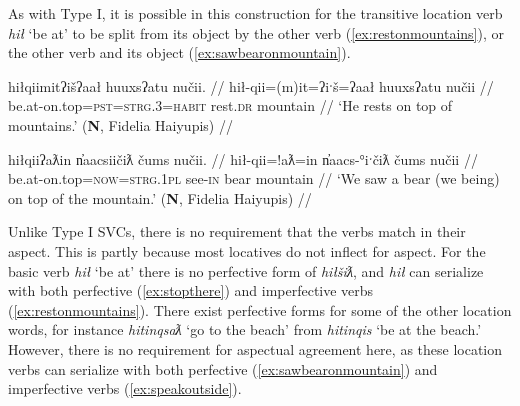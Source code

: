 As with Type I, it is possible in this construction for the transitive location verb \textit{hił} `be at' to be split from its object by the other verb (\ref{ex:restonmountains}), or the other verb and its object (\ref{ex:sawbearonmountain}).

\ex \label{ex:restonmountains}
\begingl
\glpreamble hiłqiimitʔišʔaał huuxsʔatu nučii. //
\gla hił-qii=(m)it=ʔiˑš=ʔaał huuxsʔatu nučii //
\glb be.at-on.top=\textsc{pst}=\textsc{strg.3}=\textsc{habit} rest.\textsc{dr} mountain //
\glft `He rests on top of mountains.' (\textbf{N}, Fidelia Haiyupis) //
\endgl
\xe

\ex \label{ex:sawbearonmountain}
\begingl
\glpreamble hiłqiiʔaƛin n̓aacsiičiƛ čums nučii. //
\gla hił-qii=!aƛ=in n̓aacs-°iˑčiƛ čums nučii //
\glb be.at-on.top=\textsc{now}=\textsc{strg.1pl} see-\textsc{in} bear mountain //
\glft `We saw a bear (we being) on top of the mountain.' (\textbf{N}, Fidelia Haiyupis) //
\endgl
\xe

\begin{comment}
\ex~ \label{ex:hiddeninthewall}
\begingl
\glpreamble huptsaapckʷaƛ hinałc̓ił ʔiiḥmisukʔi p̓atquk. //
\gla hupt-saˑp=ckʷiˑ=!aƛ hina-ałc̓ił ʔiiḥmis=uk=ʔiˑ p̓atquk //
\glb hide-\textsc{mo.caus}=remains.of=\textsc{now} \textsc{empty}-in.wall important=\textsc{poss}=\textsc{art} belongings //
\glft `They hid their belongings in the walls.' (\textbf{B}, Bob Mundy) //
\endgl
\xe
\end{comment}

\begin{comment}
This ``interruption" can occur the other way around, when the location word is intransitive.

\ex \label{ex:gasolinebydoor}
\begingl
\glpreamble ḥuqšiƛ ʔucačiƛ ḥaa yaqʔiitq hiiłsʔat̓uus gasoline.\footnotemark //
\gla ḥuq-šiƛ ʔu-ca-čiƛ ḥaa yaq=ʔiˑtq hił-L.sʔat̓uus gasoline //
\glb tip.over-\textsc{mo} \textsc{x}-go-\textsc{mo} who.what=\textsc{defn.3} be.at-by.the.door gasoline //
\glft `It knocked the gasoline over toward the door..' (\textbf{C}, \textit{tupaat} Julia Lucas) //
\endgl
\xe

\footnotetext{In this dependent construction, `gasoline' is the participant of the predicative relativizer \textit{yaq} `who'. The bracketing is [ḥuqšiƛ ʔucačiƛ]\textsubscript{pred} [ḥaa [yaqʔiitq hiiłsʔat̓uus gasoline] ]\textsubscript{part}}
\end{comment}

Unlike Type I SVCs, there is no requirement that the verbs match in their aspect. This is partly because most locatives do not inflect for aspect. For the basic verb \textit{hił} `be at' there is no perfective form of \textit{hiłšiƛ}, and \textit{hił} can serialize with both perfective (\ref{ex:stopthere}) and imperfective verbs (\ref{ex:restonmountains}). There exist perfective forms for some of the other location words, for instance \textit{hitinqsaƛ} `go to the beach' from \textit{hitinqis} `be at the beach.' However, there is no requirement for aspectual agreement here, as these location verbs can serialize with both perfective (\ref{ex:sawbearonmountain}) and imperfective verbs (\ref{ex:speakoutside}).

